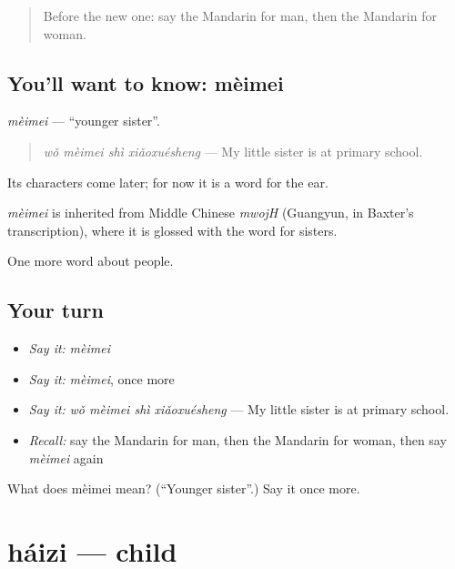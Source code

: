 \label{lesson:ZH-C33-meimei}



\begin{quote}
Before the new one: say the Mandarin for man, then the Mandarin for woman.
\end{quote}

\subsection*{You'll want to know: mèimei}
\emph{mèimei} — \textquotedblleft{}younger sister\textquotedblright{}.

\begin{quote}
\emph{wǒ mèimei shì xiǎoxuésheng} — My little sister is at primary school.
\end{quote}

Its characters come later; for now it is a word for the ear.

\begin{cousinweb}
\emph{mèimei} is inherited from Middle Chinese \emph{mwojH} (Guangyun, in Baxter's transcription), where it is glossed with the word for sisters.
\end{cousinweb}

\begin{grammarlens}[title={What you've built}]
One more word about people.
\end{grammarlens}

\subsection*{Your turn}
\begin{itemize}
\raggedright
  \item \emph{Say it:} \emph{mèimei}
  \item \emph{Say it:} \emph{mèimei}, once more
  \item \emph{Say it:} \emph{wǒ mèimei shì xiǎoxuésheng} — My little sister is at primary school.
  \item \emph{Recall:} say the Mandarin for man, then the Mandarin for woman, then say \emph{mèimei} again
\end{itemize}

\begin{tcolorbox}[breakable,colback=teal!4,colframe=teal!35!black,title={Before you move on}]
What does mèimei mean? (\textquotedblleft{}Younger sister\textquotedblright{}.) Say it once more.
\end{tcolorbox}
\section[háizi]{háizi — child}

